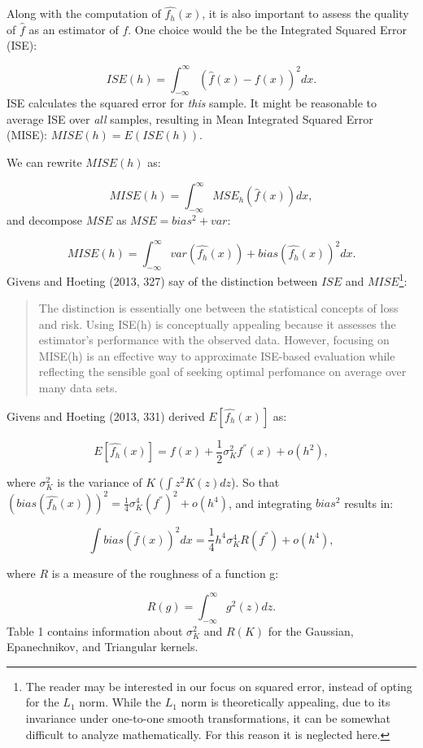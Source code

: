 \documentclass[]{article}
\let\rmarkdownfootnote\footnote%
\def\footnote{\protect\rmarkdownfootnote}
\begin{document}
Along with the computation of \(\widehat{f_h}(x)\), it is also important
to assess the quality of \(\hat{f}\) as an estimator of \(f\). One
choice would the be the Integrated Squared Error (ISE):

\[ISE(h) = \int_{-\infty}^{\infty} \left(\hat{f}(x) - f(x)\right)^2dx.\]
ISE calculates the squared error for \emph{this} sample. It might be
reasonable to average ISE over \emph{all} samples, resulting in Mean
Integrated Squared Error (MISE): \(MISE(h) = E\left(ISE(h)\right).\)

We can rewrite \(MISE(h)\) as:

\[MISE(h) = \int_{-\infty}^{\infty}MSE_h\left(\hat{f}(x)\right)dx,\] and
decompose \(MSE\) as \(MSE = bias^2 + var\):

\[MISE(h) = \int_{-\infty}^{\infty} var\left(\widehat{f_h}(x)\right) + bias\left(\widehat{f_h}(x)\right)^2 dx.\]
Givens and Hoeting (2013, 327) say of the distinction between \(ISE\)
and \(MISE\)\footnote{The reader may be interested in our focus on
  squared error, instead of opting for the \(L_1\) norm. While the
  \(L_1\) norm is theoretically appealing, due to its invariance under
  one-to-one smooth transformations, it can be somewhat difficult to
  analyze mathematically. For this reason it is neglected here.}:

\begin{quote}
The distinction is essentially one between the statistical concepts of
loss and risk. Using ISE(h) is conceptually appealing because it
assesses the estimator's performance with the observed data. However,
focusing on MISE(h) is an effective way to approximate ISE-based
evaluation while reflecting the sensible goal of seeking optimal
perfomance on average over many data sets.
\end{quote}

Givens and Hoeting (2013, 331) derived \(E[\widehat{f_h}(x)]\) as:

\[E[\widehat{f_h}(x)] = f(x) + \frac{1}{2} \sigma_K^2f^{''}(x) + o(h^2),\]

where \(\sigma_K^2\) is the variance of \(K\) (\(\int z^2 K(z) dz\)). So
that
\(\left(bias(\widehat{f_h}(x))\right)^2 = \frac{1}{4}\sigma_K^4 (f^{''})^2 + o(h^4)\),
and integrating \(bias^2\) results in:

\[\int bias\left(\hat{f}(x)\right)^2 dx = \frac{1}{4} h^4 \sigma_K^4 R(f^{''}) + o(h^4),\]

where \(R\) is a measure of the roughness of a function g:

\[R(g) = \int_{-\infty}^{\infty}g^2(z) dz.\] Table 1 contains
information about \(\sigma_K^2\) and \(R(K)\) for the Gaussian,
Epanechnikov, and Triangular kernels.
\end{document}
